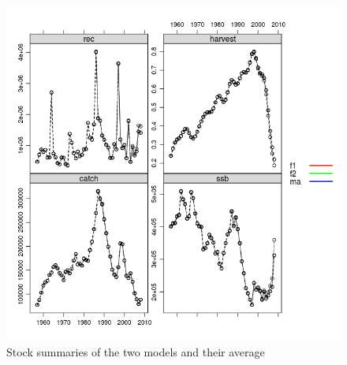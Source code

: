 \documentclass[a4paper,english,10pt]{article}\usepackage[]{graphicx}\usepackage[]{color}
\makeatletter
\def\maxwidth{ %
  \ifdim\Gin@nat@width>\linewidth
    \linewidth
  \else
    \Gin@nat@width
  \fi
}
\newenvironment{knitrout}{}{} %
\makeatother
\begin{document}
\begin{knitrout}
\color{fgcolor}\begin{figure}[H]

{\centering \includegraphics[width=\maxwidth]{figure/modav-1} 

}

\caption[Stock summaries of the two models and their average]{Stock summaries of the two models and their average}\label{fig:modav}
\end{figure}


\end{knitrout}
\end{document}
